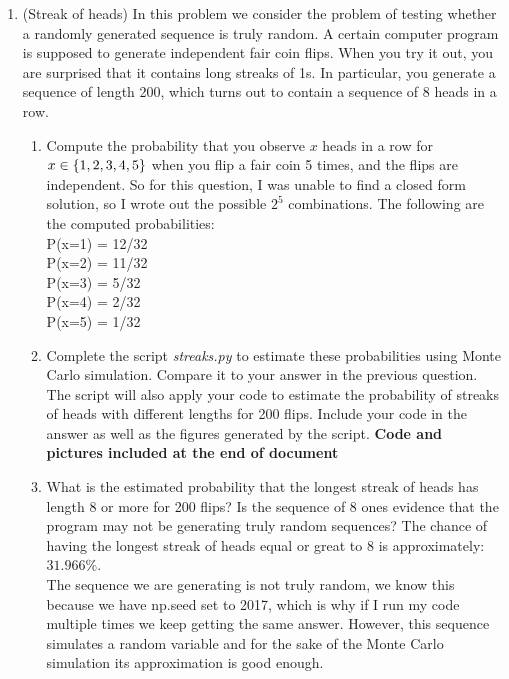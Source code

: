 \documentclass[12pt,twoside]{article}
\begin{document}
\begin{enumerate}
\begin{enumerate}
  \end{enumerate}
  
\break  
    \item (Streak of heads) 
In this problem we consider the problem of testing whether a randomly generated sequence is truly random. A certain computer program is supposed to generate independent fair coin flips. When you try it out, you are surprised that it contains long streaks of 1s. In particular, you generate a sequence of length 200, which turns out to contain a sequence of 8 heads in a row.
\begin{enumerate}
 \item Compute the probability that you observe $x$ heads in a row for $x \in \left\{ 1,2,3,4,5 \right\}$ when you flip a fair coin 5 times, and the flips are independent.
 \subitem
 So for this question, I was unable to find a closed form solution, so I wrote out the possible $2^5$ combinations. The following are the computed probabilities: \\
 
 P(x=1) = 12/32 \\
 P(x=2) = 11/32 \\ 
 P(x=3) = 5/32 \\ 
 P(x=4) = 2/32 \\ 
 P(x=5) = 1/32 \\ 
 
 
 \item Complete the script \emph{streaks.py} to estimate these probabilities using Monte Carlo simulation. Compare it to your answer in the previous question. The script will also apply your code to estimate the probability of streaks of heads with different lengths for 200 flips. Include your code in the answer as well as the figures generated by the script. 
 \subitem 
 \textbf{Code and pictures included at the end of document}

 \item What is the estimated probability that the longest streak of heads has length 8 or more for 200 flips? Is the sequence of 8 ones evidence that the program may not be generating truly random sequences?  
 \subitem
 The chance of having the longest streak of heads equal or great to 8 is approximately: $31.966\%$. \\
 The sequence we are generating is not truly random, we know this because we have np.seed set to 2017, which is why if I run my code multiple times we keep getting the same answer. However, this sequence simulates a random variable and for the sake of the Monte Carlo simulation its approximation is good enough.
 
\end{enumerate}

\end{enumerate}
\end{document}
